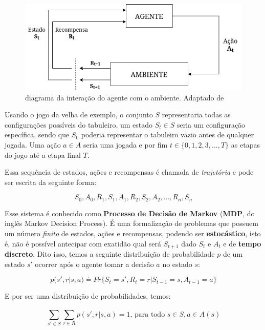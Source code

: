 \begin{figure}[h]
   \centering
   \includegraphics[scale=0.75]{figs/RL-diagram.drawio.png}
    \caption{diagrama da interação do agente com o ambiente. Adaptado de }
    \label{fig:rl-diagram}
 \end{figure}

Usando o jogo da velha de exemplo, o conjunto $S$ representaria todas as configurações possíveis do tabuleiro, um estado $S_t \in S$ seria um configuração específica, sendo que $S_0$ poderia representar o tabuleiro vazio antes de qualquer jogada. Uma ação $a \in A$ seria uma jogada e por fim $t \in \{0,1,2,3,..., T\}$ as etapas do jogo até a etapa final $T$.

Essa sequência de estados, ações e recompensas é chamada de \textit{trajetória} e pode ser escrita da seguinte forma:

\begin{equation} \label{trajectory}
   S_0, A_0, R_1, S_1, A_1, R_2, S_2, A_2, ... , R_n, S_n
\end{equation}

Esse sistema é conhecido como \textbf{Processo de Decisão de Markov} (\textbf{MDP}, do inglês Markov Decision Process). É uma formalização de problemas que possuem um número \textit{finito} de estados, ações e recompensas, podendo ser \textbf{estocástico}, isto é, não é possível antecipar com exatidão qual será $S_{t+1}$ dado $S_t$ e $A_t$ e de \textbf{tempo discreto}. Dito isso, temos a seguinte distribuição de probabilidade $p$ de um estado $s'$ ocorrer após o agente tomar a decisão $a$ no estado $s$:

\begin{equation} \label{p-definition}
   p(s', r | s, a) \doteq Pr\{S_t = s', R_t = r | S_{t-1} = s, A_{t-1} = a\}
\end{equation}

E por ser uma distribuição de probabilidades, temos: 

\begin{equation} \label{p-sum}
   \sum_{s' \in S}^{} \sum_{r \in R}^{}p(s', r | s, a) = 1 \text{, para todo } s \in S, a \in A(s) 
\end{equation}

